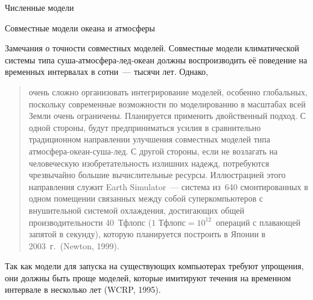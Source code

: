 \begin{chapter}{Численные модели}
\begin{section}{Совместные модели океана и атмосферы}
\begin{paragraph}{Замечания о точности совместных моделей.}%
%
%
Совместные модели климатической системы типа суша-атмосфера-лед-океан 
должны воспроизводить её поведение на временных интервалах
в сотни~--- тысячи лет. Однако,
%
\begin{quote}
очень сложно организовать интегрирование моделей, особенно глобальных,
поскольку современные возможности по моделированию в масштабах всей Земли
очень ограничены. Планируется применить двойственный подход. 
С одной стороны, будут предприниматься усилия в сравнительно традиционном 
направлении улучшения совместных моделей типа атмосфера-океан-суша-лед.
С другой стороны, если не возлагать на человеческую изобретательность излишних
надежд, потребуются чрезвычайно большие вычислительные ресурсы. Иллюстрацией
этого направления служит Earth Simulator~--- система из~640 
смонтированных в одном помещении связанных между собой суперкомпьютеров 
с внушительной системой охлаждения,
достигающих общей производительности 40~Тфлопс 
($1\text{~Тфлопс} = 10^{12}$~операций с плавающей запятой в секунду), 
которую планируется построить в Японии в 2003~г.\ (Newton, 1999).
%
\end{quote}
Так как модели для запуска на существующих компьютерах требуют упрощения,
они должны быть проще моделей, которые имитируют течения на временном 
интервале в несколько лет (WCRP, 1995).
%


\end{paragraph}
\end{section}
\end{chapter}
